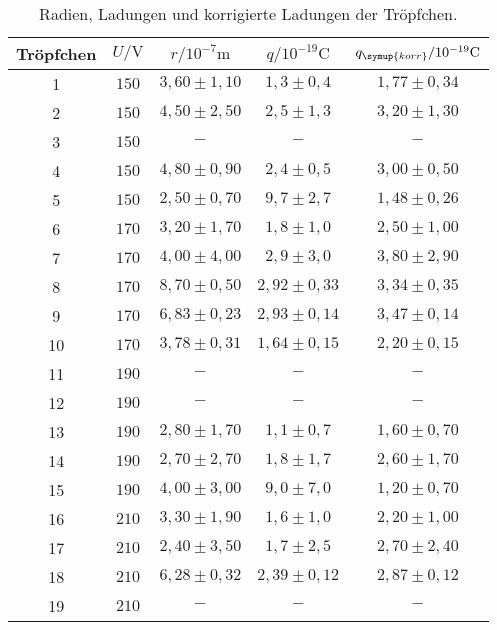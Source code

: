 \begin{table}
  \centering
  \caption{Radien, Ladungen und korrigierte Ladungen der Tröpfchen.}
  \label{tab:q}
  \begin{tabular}{c | c c c c}
    \toprule
    Tröpfchen & $U/\si{\volt}$ & $r/10^{-7}\si{\meter}$ & $q/10^{-19}\si{\coulomb}$ & $q_{\symup{korr}}/10^{-19}\si{\coulomb}$ \\
    \midrule
     1 & $150$ & $3,60 \pm 1,10$  & $1,3 \pm 0,4$   & $1,77 \pm 0,34$   \\
     2 & $150$ & $4,50 \pm 2,50$  & $2,5 \pm 1,3$   & $3,20 \pm 1,30$   \\
     3 & $150$ & $-$              & $-$             & $-$               \\
     4 & $150$ & $4,80 \pm 0,90$  & $2,4 \pm 0,5$   & $3,00 \pm 0,50$   \\
     5 & $150$ & $2,50 \pm 0,70$  & $9,7 \pm 2,7$   & $1,48 \pm 0,26$   \\
     6 & $170$ & $3,20 \pm 1,70$  & $1,8 \pm 1,0$   & $2,50 \pm 1,00$   \\
     7 & $170$ & $4,00 \pm 4,00$  & $2,9 \pm 3,0$   & $3,80 \pm 2,90$   \\
     8 & $170$ & $8,70 \pm 0,50$  & $2,92 \pm 0,33$ & $3,34 \pm 0,35$   \\
     9 & $170$ & $6,83 \pm 0,23$  & $2,93 \pm 0,14$ & $3,47 \pm 0,14$   \\
    10 & $170$ & $3,78 \pm 0,31$  & $1,64 \pm 0,15$ & $2,20 \pm 0,15$   \\
    11 & $190$ & $-$              & $-$             & $-$               \\
    12 & $190$ & $-$              & $-$             & $-$               \\
    13 & $190$ & $2,80 \pm 1,70$  & $1,1 \pm 0,7$   & $1,60 \pm 0,70$   \\
    14 & $190$ & $2,70 \pm 2,70$  & $1,8 \pm 1,7$   & $2,60 \pm 1,70$   \\
    15 & $190$ & $4,00 \pm 3,00$  & $9,0 \pm 7,0$   & $1,20 \pm 0,70$   \\
    16 & $210$ & $3,30 \pm 1,90$  & $1,6 \pm 1,0$   & $2,20 \pm 1,00$   \\
    17 & $210$ & $2,40 \pm 3,50$  & $1,7 \pm 2,5$   & $2,70 \pm 2,40$   \\
    18 & $210$ & $6,28 \pm 0,32$  & $2,39 \pm 0,12$ & $2,87 \pm 0,12$   \\
    19 & $210$ & $-$              & $-$             & $-$               \\

\end{tabular}
\end{table}
